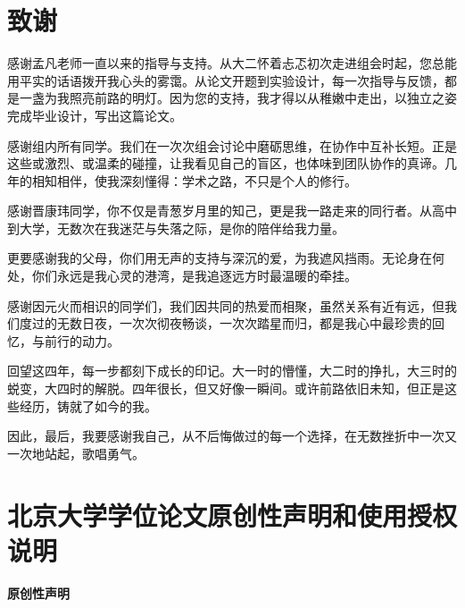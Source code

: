 \documentclass[12pt, a4paper]{ctexart}
\begin{document}




\newpage
\section{致谢}

感谢孟凡老师一直以来的指导与支持。从大二怀着忐忑初次走进组会时起，您总能用平实的话语拨开我心头的雾霭。从论文开题到实验设计，每一次指导与反馈，都是一盏为我照亮前路的明灯。因为您的支持，我才得以从稚嫩中走出，以独立之姿完成毕业设计，写出这篇论文。

感谢组内所有同学。我们在一次次组会讨论中磨砺思维，在协作中互补长短。正是这些或激烈、或温柔的碰撞，让我看见自己的盲区，也体味到团队协作的真谛。几年的相知相伴，使我深刻懂得：学术之路，不只是个人的修行。

感谢晋康玮同学，你不仅是青葱岁月里的知己，更是我一路走来的同行者。从高中到大学，无数次在我迷茫与失落之际，是你的陪伴给我力量。

更要感谢我的父母，你们用无声的支持与深沉的爱，为我遮风挡雨。无论身在何处，你们永远是我心灵的港湾，是我追逐远方时最温暖的牵挂。

感谢因元火而相识的同学们，我们因共同的热爱而相聚，虽然关系有近有远，但我们度过的无数日夜，一次次彻夜畅谈，一次次踏星而归，都是我心中最珍贵的回忆，与前行的动力。

回望这四年，每一步都刻下成长的印记。大一时的懵懂，大二时的挣扎，大三时的蜕变，大四时的解脱。四年很长，但又好像一瞬间。或许前路依旧未知，但正是这些经历，铸就了如今的我。

因此，最后，我要感谢我自己，从不后悔做过的每一个选择，在无数挫折中一次又一次地站起，歌唱勇气。


\newpage
\section{北京大学学位论文原创性声明和使用授权说明}

\vspace{1em} %

\begin{center}
    \textbf{原创性声明}
\end{center}

\vspace{1em} %
\end{document}
